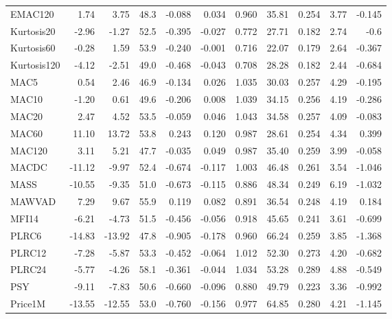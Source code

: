 \documentclass[preprint,12pt]{elsarticle}
\begin{document}
{\begin{longtable}{lrrrrrrrrrr}
    EMAC120 &   1.74 &  3.75 &   48.3 &   -0.088 & 0.034 & 0.960 &     35.81 & 0.254 & 3.77 & -0.145 \\
    Kurtosis20 &   -2.96 &  -1.27 &   52.5 &   -0.395 & -0.027 & 0.772 &     27.71 & 0.182 & 2.74 & -0.6 \\
    Kurtosis60 &   -0.28 &  1.59 &   53.9 &   -0.240 & -0.001 & 0.716 &     22.07 & 0.179 & 2.64 & -0.367 \\
    Kurtosis120 &   -4.12 &  -2.51 &   49.0 &   -0.468 & -0.043 & 0.708 &     28.28 & 0.182 & 2.44 & -0.684 \\
    MAC5 &   0.54 &  2.46 &   46.9 &   -0.134 & 0.026 & 1.035 &     30.03 & 0.257 & 4.29 & -0.195 \\
    MAC10 &   -1.20 &  0.61 &   49.6 &   -0.206 & 0.008 & 1.039 &     34.15 & 0.256 & 4.19 & -0.286 \\
    MAC20 &   2.47 &  4.52 &   53.5 &   -0.059 & 0.046 & 1.043 &     34.58 & 0.257 & 4.09 & -0.083 \\
    MAC60 &   11.10 &  13.72 &   53.8 &   0.243 & 0.120 & 0.987 &     28.61 & 0.254 & 4.34 & 0.399 \\
    MAC120 &   3.11 &  5.21 &   47.7 &   -0.035 & 0.049 & 0.987 &     35.40 & 0.259 & 3.99 & -0.058 \\
    MACDC &   -11.12 &  -9.97 &   52.4 &   -0.674 & -0.117 & 1.003 &     46.48 & 0.261 & 3.54 & -1.046 \\
    MASS &   -10.55 &  -9.35 &   51.0 &   -0.673 & -0.115 & 0.886 &     48.34 & 0.249 & 6.19 & -1.032 \\
    MAWVAD &   7.29 &  9.67 &   55.9 &   0.119 & 0.082 & 0.891 &     36.54 & 0.248 & 4.19 & 0.184 \\
    MFI14 &   -6.21 &  -4.73 &   51.5 &   -0.456 & -0.056 & 0.918 &     45.65 & 0.241 & 3.61 & -0.699 \\
    PLRC6 &   -14.83 &  -13.92 &   47.8 &   -0.905 & -0.178 & 0.960 &     66.24 & 0.259 & 3.85 & -1.368 \\
    PLRC12 &   -7.28 &  -5.87 &   53.3 &   -0.452 & -0.064 & 1.012 &     52.30 & 0.273 & 4.20 & -0.682 \\
    PLRC24 &   -5.77 &  -4.26 &   58.1 &   -0.361 & -0.044 & 1.034 &     53.28 & 0.289 & 4.88 & -0.549 \\
    PSY &   -9.11 &  -7.83 &   50.6 &   -0.660 & -0.096 & 0.880 &     49.79 & 0.223 & 3.36 & -0.992 \\
    Price1M &   -13.55 &  -12.55 &   53.0 &   -0.760 & -0.156 & 0.977 &     64.85 & 0.280 & 4.21 & -1.145 \\

\end{longtable}}
\end{document}
